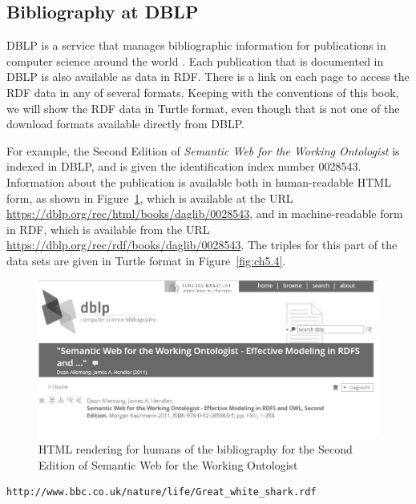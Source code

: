 \subsection{Bibliography at DBLP}

DBLP is a service that manages bibliographic information for publications
in computer science around the world \cite{DBLP:conf/spire/Ley02}.  Each 
publication that is documented in DBLP is also available as data in RDF. 
There is a link on each page to access the RDF data in any of several 
formats.  Keeping with the conventions of this book, we will show the
RDF data in Turtle format, even though that is not one of the download formats 
available directly from DBLP. 

For example, the Second Edition of \emph{Semantic Web for the Working Ontologist} is 
indexed in DBLP, and is given the identification index number 0028543.  Information about
the publication is available both in human-readable HTML form, as shown in Figure~\ref{fig:ch5.3}, 
which is available at the URL \url{https://dblp.org/rec/html/books/daglib/0028543}, and in machine-readable form
in RDF, which is available from the URL \url{https://dblp.org/rec/rdf/books/daglib/0028543}. 
The triples for this part of the data sets are given in Turtle format in Figure~\ref{fig:ch5.4}.


\begin{figure}
    \centering
     \includegraphics[width=5.0in]{media/ch5/figure-05-03.jpg}
    \caption{HTML rendering for humans of the bibliography for the Second Edition of Semantic Web for the Working Ontologist}
    \label{fig:ch5.3}
\end{figure}





\begin{lstlisting}
http://www.bbc.co.uk/nature/life/Great_white_shark.rdf
\end{lstlisting}

